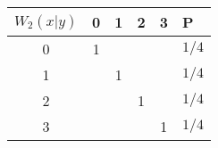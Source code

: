 \begin{tabular}{c|c|c|c|c||l|}
$W_2(x|y)$ & 0 & 1 & 2 & 3 & P     \\ \hline
0          & 1 &   &   &   & $1/4$ \\ \hline
1          &   & 1 &   &   & $1/4$ \\ \hline
2          &   &   & 1 &   & $1/4$ \\ \hline
3          &   &   &   & 1 & $1/4$ \\ \hline
\end{tabular}
